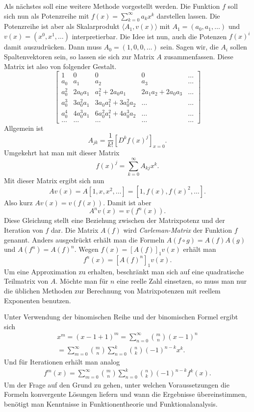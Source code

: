 \documentclass[a4paper,10pt,fleqn,twocolumn,twoside]{article}
\begin{document}
Als nächstes soll eine weitere Methode vorgestellt werden. Die
Funktion \(f\) soll sich nun als Potenzreihe mit
\(f(x)=\sum_{k=0}^\infty a_kx^k\) darstellen lassen. Die Potenzreihe
ist aber als Skalarprodukt \(\langle A_1,v(x)\rangle\) mit
\(A_1=(a_0,a_1,\ldots)\) und \(v(x)=(x^0,x^1,\ldots)\)
interpretierbar. Die Idee ist nun, auch die Potenzen \(f(x)^i\) damit
auszudrücken. Dann muss \(A_0=(1,0,0,\ldots)\) sein. Sagen wir, die
\(A_i\) sollen Spaltenvektoren sein, so lassen sie sich zur Matrix
\(A\) zusammenfassen. Diese Matrix ist also von folgender Gestalt.
\[\begin{bmatrix}
1 & 0 & 0 & 0 & \ldots\\
a_0 & a_1 & a_2 & a_3 & \ldots\\
a_0^2 & 2a_0a_1 & a_1^2+2a_0a_1 & 2a_1a_2+2a_0a_3 &\ldots\\
a_0^3 & 3a_0^2a_1 & 3a_0a_1^2+3a_0^2a_2 &\ldots &\ldots\\
a_0^4 & 4a_0^3a_1 & 6a_0^2a_1^2+4a_0^3a_2 & \ldots & \ldots\\
\ldots &\ldots &\ldots &\ldots & \ldots
\end{bmatrix}\]
Allgemein ist
\[A_{jk} = \frac{1}{k!}[D^k f(x)^j]_{x=0}.\]
Umgekehrt hat man mit dieser Matrix
\[f(x)^j = \sum_{k=0}^\infty A_{kj} x^k.\]
Mit dieser Matrix ergibt sich nun
\[Av(x) = A[1,x,x^2,\ldots] = [1,f(x),f(x)^2,\ldots].\]
Also kurz \(Av(x)=v(f(x))\). Damit ist aber
\[A^n v(x) = v(f^n(x)).\]
Diese Gleichung stellt eine Beziehung zwischen der Matrixpotenz und
der Iteration von \(f\) dar. Die Matrix \(A(f)\) wird
\textit{Carleman-Matrix}
der Funktion \(f\) genannt. Anders ausgedrückt erhält man die Formeln
\(A(f\circ g) = A(f)A(g)\) und \(A(f^n)=A(f)^n\).
Wegen \(f(x)=[A(f)]_1v(x)\) erhält man
\[f^n(x) = [A(f)^n]_1v(x).\]
Um eine Approximation zu erhalten, beschränkt man sich auf eine
quadratische Teilmatrix von \(A\). Möchte man für \(n\) eine reelle
Zahl einsetzen, so muss man nur die üblichen Methoden zur Berechnung
von Matrixpotenzen mit reellem Exponenten benutzen.

Unter Verwendung der binomischen Reihe und der binomischen Formel
ergibt sich
\begin{gather*}
x^m = (x-1+1)^m = \sum_{n=0}^\infty \binom{m}{n}(x-1)^n\\
= \sum_{m=0}^\infty \binom{m}{n}\sum_{n=0}^k\binom{n}{k}(-1)^{n-k}x^k.
\end{gather*}
Und für Iterationen erhält man analog
\begin{gather*}
f^m(x) = \sum_{m=0}^\infty \binom{m}{n}
\sum_{n=0}^k\binom{n}{k}(-1)^{n-k}f^k(x).
\end{gather*}
Um der Frage auf den Grund zu gehen, unter welchen Voraussetzungen
die Formeln konvergente Lösungen liefern und wann die Ergebnisse
übereinstimmen, benötigt man Kenntnisse in Funktionentheorie
und Funktionalanalysis.
\end{document}
